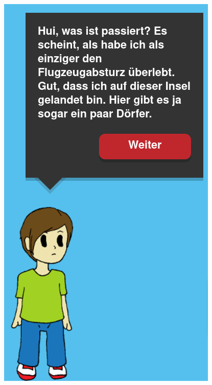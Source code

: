 \documentclass[
  a4paper,
  DIV=11,
  numbers=noendperiod]{scrartcl}
\begin{document}
\begin{figure}

{\centering 

\href{https://sql-island.informatik.uni-kl.de/}{\includegraphics{sql_island.png}}

}

\end{figure}
\end{document}
